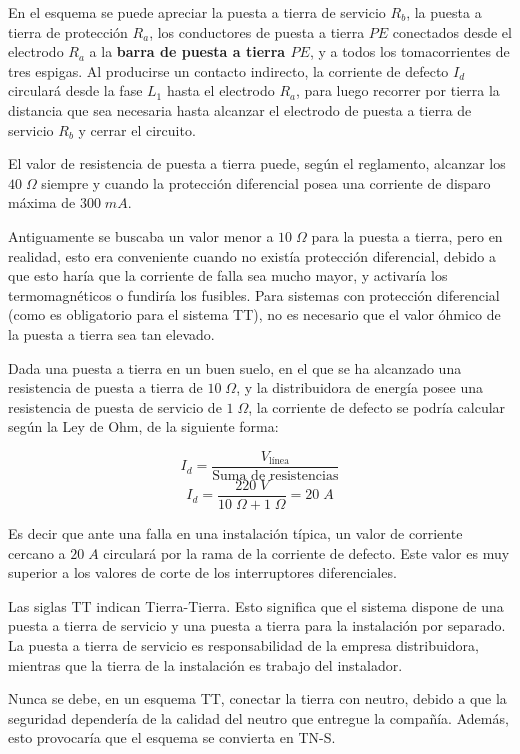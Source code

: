 En el esquema se puede apreciar la puesta a tierra de servicio $R_b$, la puesta a tierra de protección $R_a$, los conductores de puesta a tierra $PE$ conectados desde el electrodo $R_a$ a la \textbf{barra de puesta a tierra $PE$}, y a todos los tomacorrientes de tres espigas.
Al producirse un contacto indirecto, la corriente de defecto $I_d$ circulará desde la fase $L_1$ hasta el electrodo $R_a$, para luego recorrer por tierra la distancia que sea necesaria hasta alcanzar el electrodo de puesta a tierra de servicio $R_b$ y cerrar el circuito.

El valor de resistencia de puesta a tierra puede, según el reglamento, alcanzar los $40\; \Omega$ siempre y cuando la protección diferencial posea una corriente de disparo máxima de $300\; mA$.

Antiguamente se buscaba un valor menor a $10\; \Omega$ para la puesta a tierra, pero en realidad, esto era conveniente cuando no existía protección diferencial, debido a que esto haría que la corriente de falla sea mucho mayor, y activaría los termomagnéticos o fundiría los fusibles. Para sistemas con protección diferencial (como es obligatorio para el sistema TT), no es necesario que el valor óhmico de la puesta a tierra sea tan elevado.

\begin{ejemplo}
	Dada una puesta a tierra en un buen suelo, en el que se ha alcanzado una resistencia de puesta a tierra de $10\; \Omega$, y la distribuidora de energía posee una resistencia de puesta de servicio de $1\; \Omega$, la corriente de defecto se podría calcular según la Ley de Ohm, de la siguiente forma:
	
	$$I_d= \frac{V_{\text{línea}}}{\text{Suma de resistencias}}$$
	$$I_d = \frac{220\; V}{10\; \Omega + 1\; \Omega}=20\; A $$

	Es decir que ante una falla en una instalación típica, un valor de corriente cercano a $20\; A$ circulará por la rama de la corriente de defecto. Este valor es muy superior a los valores de corte de los interruptores diferenciales.
\end{ejemplo}

Las siglas TT indican Tierra-Tierra. Esto significa que el sistema dispone de una puesta a tierra de servicio y una puesta a tierra para la instalación por separado. La puesta a tierra de servicio es responsabilidad de la empresa distribuidora, mientras que la tierra de la instalación es trabajo del instalador.

Nunca se debe, en un esquema TT, conectar la tierra con neutro, debido a que la seguridad dependería de la calidad del neutro que entregue la compañía. Además, esto provocaría que el esquema se convierta en TN-S.

